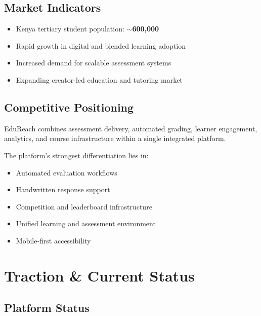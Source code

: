 \documentclass[a4paper,11pt]{article}
\begin{document}
\subsection*{Market Indicators}

\begin{itemize}[nosep]
    \item Kenya tertiary student population: \textbf{$\sim$600,000}
    \item Rapid growth in digital and blended learning adoption
    \item Increased demand for scalable assessment systems
    \item Expanding creator-led education and tutoring market
\end{itemize}

\subsection*{Competitive Positioning}

EduReach combines assessment delivery, automated grading, learner engagement, analytics, and course infrastructure within a single integrated platform.

The platform's strongest differentiation lies in:

\begin{itemize}[nosep]
    \item Automated evaluation workflows
    \item Handwritten response support
    \item Competition and leaderboard infrastructure
    \item Unified learning and assessment environment
    \item Mobile-first accessibility
\end{itemize}

\section{Traction \& Current Status}

\subsection*{Platform Status}
\end{document}

